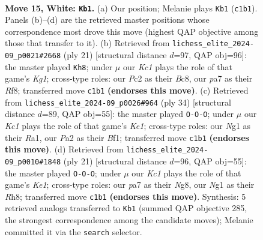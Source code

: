 \documentclass[11pt]{article}
\begin{document}
\clearpage

\begin{figure}[p]\centering
\begin{subfigure}{0.46\textwidth}\centering
\resizebox{\linewidth}{!}{%
\newchessgame
\chessboard[
  setfen={rnb1r2k/p2nq2p/1pp1p1p1/3pP3/8/2N5/PPPQ1PPP/2K1RBNR w - - 0 15},
  showmover=false,
  pgfstyle=straightmove, color=movearrow, markmove={c1-b1}
]}
\caption{}
\end{subfigure}\hfill
\begin{subfigure}{0.46\textwidth}\centering
\resizebox{\linewidth}{!}{%
\newchessgame
\chessboard[
  setfen={r1b2rk1/pp1ppp1p/1qn4b/8/3PP2p/1PPQ1N2/P5PP/RN2KB1R b KQ - 2 11},
  showmover=false,
  pgfstyle=straightmove, color=movearrow, markmove={g8-h8}
]}
\caption{}
\end{subfigure}
\\[4pt]
\begin{subfigure}{0.46\textwidth}\centering
\resizebox{\linewidth}{!}{%
\newchessgame
\chessboard[
  setfen={r1bqk2r/ppp2p2/3pn2p/8/4PPnP/2N3pN/PPPQ2P1/R3KB1R w KQkq - 0 18},
  showmover=false,
  pgfstyle=straightmove, color=movearrow, markmove={e1-c1}
]}
\caption{}
\end{subfigure}\hfill
\begin{subfigure}{0.46\textwidth}\centering
\resizebox{\linewidth}{!}{%
\newchessgame
\chessboard[
  setfen={r3k1nr/ppq2p1p/2nbp3/3p1p2/3P4/2PQ1N1P/PP3PP1/RNB1R1K1 b kq - 3 11},
  showmover=false,
  pgfstyle=straightmove, color=movearrow, markmove={e8-c8}
]}
\caption{}
\end{subfigure}
\caption{\textbf{Move 15, White: \texttt{Kb1}.} (a) Our position; Melanie plays \texttt{Kb1} (\texttt{c1b1}). Panels (b)--(d) are the retrieved master positions whose correspondence most drove this move (highest QAP objective among those that transfer to it). (b) Retrieved from \texttt{lichess\_elite\_2024-09\_p0021\#2668} (ply 21) [structural distance $d$=97, QAP obj=96]: the master played \texttt{Kh8}; under $\mu$ our \emph{Kc1} plays the role of that game's \emph{Kg1}; cross-type roles: our \emph{P}c2 as their \emph{B}c8, our \emph{p}a7 as their \emph{R}f8; transferred move \texttt{c1b1} \textbf{(endorses this move)}. (c) Retrieved from \texttt{lichess\_elite\_2024-09\_p0026\#964} (ply 34) [structural distance $d$=89, QAP obj=55]: the master played \texttt{O-O-O}; under $\mu$ our \emph{Kc1} plays the role of that game's \emph{Ke1}; cross-type roles: our \emph{N}g1 as their \emph{R}a1, our \emph{P}a2 as their \emph{B}f1; transferred move \texttt{c1b1} \textbf{(endorses this move)}. (d) Retrieved from \texttt{lichess\_elite\_2024-09\_p0010\#1848} (ply 21) [structural distance $d$=96, QAP obj=55]: the master played \texttt{O-O-O}; under $\mu$ our \emph{Kc1} plays the role of that game's \emph{Ke1}; cross-type roles: our \emph{p}a7 as their \emph{N}g8, our \emph{N}g1 as their \emph{R}h8; transferred move \texttt{c1b1} \textbf{(endorses this move)}. Synthesis: 5 retrieved analogs transferred to \texttt{Kb1} (summed QAP objective 285, the strongest correspondence among the candidate moves); Melanie committed it via the \texttt{search} selector.}
\label{fig:thought-m28}
\end{figure}
\end{document}
